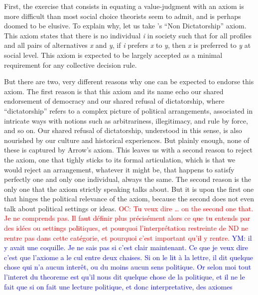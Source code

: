 \documentclass[preprint, french, english, 11pt]{elsarticle}%
\newcommand{\commentYM}[1]{\textcolor{blue}{YM: #1}}
\newcommand{\commentOC}[1]{\textcolor{red}{OC: #1}}
\begin{document}
First, the exercise that consists in equating a value-judgment with an axiom is more difficult than most social choice theorists seem to admit, and is perhaps doomed to be elusive. To explain why, let us take \cite{arrow_social_2012}'s “Non Dictatorship” axiom. This axiom states that there is no individual \emph{i} in society such that for all profiles and all pairs of alternatives \emph{x} and \emph{y}, if \emph{i} prefers \emph{x} to \emph{y}, then \emph{x} is preferred to \emph{y} at social level. This axiom is expected to be largely accepted as a minimal requirement for any collective decision rule.

But there are two, very different reasons why one can be expected to endorse this axiom. The first reason is that this axiom and its name echo our shared endorsement of democracy and our shared refusal of dictatorship, where ``dictatorship'' refers to a complex picture of political arrangements, associated in intricate ways with notions such as arbitrariness, illegitimacy, and rule by force, and so on. Our shared refusal of dictatorship, understood in this sense, is also nourished by our culture and historical experiences. But plainly enough, none of these is captured by Arrow's axiom. This leaves us with a second reason to reject the axiom, one that tighly sticks to its formal articulation, which is that we would reject an arrangement, whatever it might be, that happens to satisfy perfectly one and only one individual, always the same. The second reason is the only one that the axiom strictly speaking talks about. But it is upon the first one that hinges the political relevance of the axiom, because the second does not even talk about political settings or ideas. 
\commentOC{Tu veux dire … on the second one that. Je ne comprends pas. Il faut définir plus précisément alors ce que tu entends par des idées ou settings politiques, et pourquoi l’interprétation restreinte de ND ne rentre pas dans cette catégorie, et pourquoi c’est important qu’il y rentre.}
\commentYM{il y avait une coquille. Je ne sais pas si c'est clair maintenant. Ce que je veux dire c'est que l'axiome a le cul entre deux chaises. Si on le lit à la lettre, il dit quelque chose qui n'a aucun interêt, ou du moins aucun sens politique. Or selon moi tout l'interet du theoreme est qu'il nous dit quelque chose de la politique, et il ne le fait que si on fait une lecture politique, et donc interpretative, des axiomes} 
\end{document}
